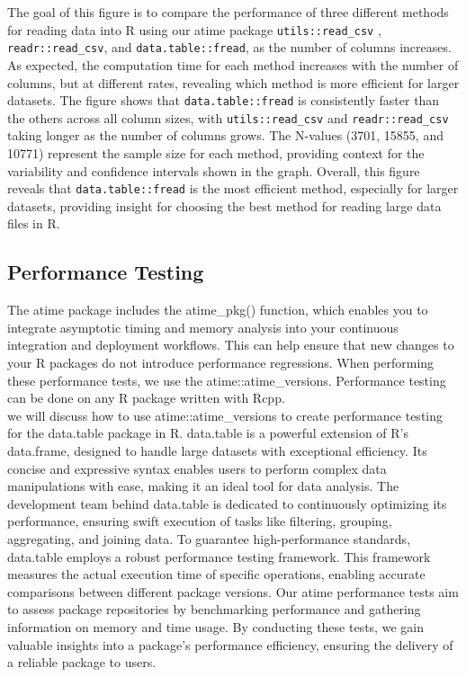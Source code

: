 The goal of this figure is to compare the performance of three different methods for reading data into R using our atime package \texttt{utils::read\_csv} , \texttt{readr::read\_csv}, and \texttt{data.table::fread}, as the number of columns increases. As expected, the computation time for each method increases with the number of columns, but at different rates, revealing which method is more efficient for larger datasets. The figure shows that \texttt{data.table::fread} is consistently faster than the others across all column sizes, with \texttt{utils::read\_csv} and \texttt{readr::read\_csv} taking longer as the number of columns grows. The N-values (3701, 15855, and 10771) represent the sample size for each method, providing context for the variability and confidence intervals shown in the graph. Overall, this figure reveals that \texttt{data.table::fread} is the most efficient method, especially for larger datasets, providing insight for choosing the best method for reading large data files in R.


\subsection{Performance Testing}
The atime package includes the atime\_pkg() function, which enables you to integrate asymptotic timing and memory analysis into your continuous integration and deployment workflows. 
This can help ensure that new changes to your R packages do not introduce performance regressions. When performing these performance tests, we use the atime::atime\_versions.
Performance testing can be done on any R package written with Rcpp.\\


\noindent we will discuss how to use atime::atime\_versions to create performance testing for the data.table package in R.
data.table is a powerful extension of R's data.frame, designed to handle large datasets with exceptional efficiency. Its concise and expressive syntax enables users to perform complex data manipulations with ease, making it an ideal tool for data analysis. The development team behind data.table is dedicated to continuously optimizing its performance, ensuring swift execution of tasks like filtering, grouping, aggregating, and joining data.
\vspace{0.1in}
To guarantee high-performance standards, data.table employs a robust performance testing framework. This framework measures the actual execution time of specific operations, enabling accurate comparisons between different package versions. 
Our atime performance tests aim to assess package repositories by benchmarking performance and gathering information on memory and time usage. 
\vspace{0.1in}
By conducting these tests, we gain valuable insights into a package's performance efficiency, ensuring the delivery of a reliable package to users.
\vspace{0.1in}

